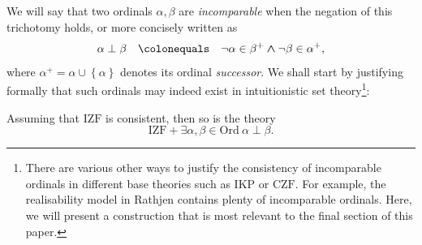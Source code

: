 \documentclass{asl}
\theoremstyle{plain}
\newcommand{\Ord}{\mathrm{Ord}}
\begin{document}
We will say that two ordinals $\alpha, \beta$ are \emph{incomparable} when the negation of this trichotomy holds, or more concisely written as
\[\alpha \perp \beta \quad \colonequals \quad \neg \alpha \in \beta^+ \land \neg \beta \in \alpha^+,\]
where $\alpha^+ = \alpha \cup \left\{\alpha\right\}$ denotes its ordinal \emph{successor}. We shall start by justifying formally that such ordinals may indeed exist in intuitionistic set theory\footnote{There are various other ways to justify the consistency of incomparable ordinals in different base theories such as $\mathrm{IKP}$ or $\mathrm{CZF}$. For example, the realisability model in Rathjen \cite{rathjen06-czf-realizability} contains plenty of incomparable ordinals. Here, we will present a construction that is most relevant to the final section of this paper.}:

\begin{proposition}
  \label{prop:perp-consistent}
  Assuming that $\mathrm{IZF}$ is consistent, then so is the theory
  \[\mathrm{IZF} + \exists \alpha, \beta \in \Ord \ \alpha \perp \beta.\]
\end{proposition}
\end{document}
